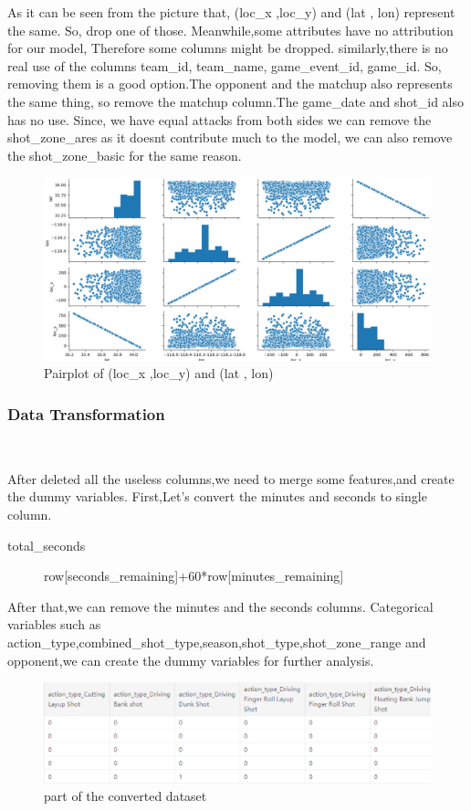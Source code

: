 As it can be seen from 
the picture that, (loc_x ,loc_y) and (lat , lon) represent the same.
So, drop one of those.
Meanwhile,some attributes have no attribution for our model,
Therefore some columns might be dropped.
similarly,there is no real use of the columns team_id, team_name, game_event_id, game_id.
So, removing them is a good option.The opponent and the matchup also represents the same thing, 
so remove the matchup column.The game_date and shot_id also has no use.
Since, we have equal attacks from both sides we can remove the shot_zone_ares as it
doesnt contribute much to the model, we can also remove the shot_zone_basic for the same reason.


\begin{figure}[H]
	\centering
	\includegraphics[scale=0.25]{t.eps
	}        %
	\caption{Pairplot of (loc\_x ,loc\_y) and (lat , lon)}
	\label{fig7}
\end{figure}


\subsubsection{Data Transformation}
\

After deleted all the useless columns,we need to merge some features,and create the dummy variables.
First,Let's convert the minutes and seconds to single column.
\begin{description}
	\item[total\_seconds] \DIFaddbegin \DIFadd{= }\DIFaddend row[seconds\_remaining]+60*row[minutes\_remaining] 
\end{description}
After that,we can remove the minutes and the seconds columns.
Categorical variables such as action_type,combined_shot_type,season,shot_type,shot_zone_range 
and opponent,we can create the dummy variables for further analysis.
\begin{figure}[htbp]
	\centering
	\includegraphics[scale=0.5]{u.eps
	}        %
	\caption{part of the converted dataset}
	\label{fig8}
\end{figure}
\newpage

